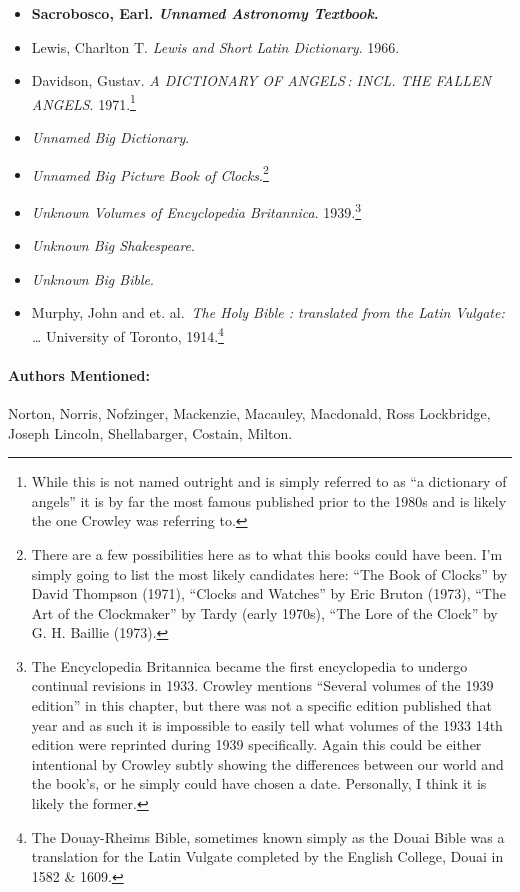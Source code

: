 \documentclass[12pt]{article}
\begin{document}
\begin{itemize}
\item
  \textbf{Sacrobosco, Earl. \emph{Unnamed Astronomy Textbook}.}
\item
  Lewis, Charlton T. \emph{Lewis and Short Latin Dictionary}. 1966.
\item
  Davidson, Gustav. \emph{A DICTIONARY OF ANGELS\,: INCL. THE FALLEN ANGELS}. 1971.\footnote{While this is not named outright and is simply referred to as ``a dictionary of angels'' it is by far the most famous published prior to the 1980s and is likely the one Crowley was referring to.}
\item
  \emph{Unnamed Big Dictionary}.
\item
  \emph{Unnamed Big Picture Book of Clocks}.\footnote{There are a few possibilities here as to what this books could have been. I'm simply going to list the most likely candidates here: ``The Book of Clocks'' by David Thompson (1971), ``Clocks and Watches'' by Eric Bruton (1973), ``The Art of the Clockmaker'' by Tardy (early 1970s), ``The Lore of the Clock'' by G. H. Baillie (1973).}
\item
  \emph{Unknown Volumes of Encyclopedia Britannica}. 1939.\footnote{The Encyclopedia Britannica became the first encyclopedia to undergo continual revisions in 1933. Crowley mentions ``Several volumes of the 1939 edition'' in this chapter, but there was not a specific edition published that year and as such it is impossible to easily tell what volumes of the 1933 14th edition were reprinted during 1939 specifically. Again this could be either intentional by Crowley subtly showing the differences between our world and the book's, or he simply could have chosen a date. Personally, I think it is likely the former.}
\item
  \emph{Unknown Big Shakespeare}.
\item
  \emph{Unknown Big Bible}.
\item
  Murphy, John and et. al.~\emph{The Holy Bible : translated from the Latin Vulgate: \ldots{}} University of Toronto, 1914.\footnote{The Douay-Rheims Bible, sometimes known simply as the Douai Bible was a translation for the Latin Vulgate completed by the English College, Douai in 1582 \& 1609.}
\end{itemize}

\paragraph{Authors Mentioned:}\label{authors-mentioned-12}

Norton, Norris, Nofzinger, Mackenzie, Macauley, Macdonald, Ross Lockbridge, Joseph Lincoln, Shellabarger, Costain, Milton.
\end{document}
